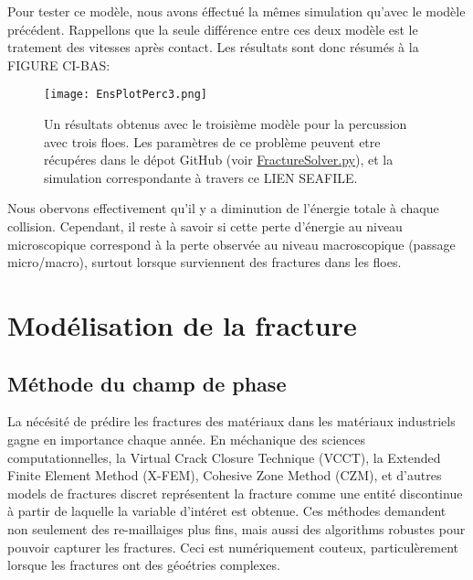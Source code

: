 Pour tester ce modèle, nous avons éffectué la mêmes simulation qu'avec le modèle précédent. Rappellons que la seule différence entre ces deux modèle est le tratement des vitesses après contact. Les résultats sont donc résumés à la FIGURE CI-BAS:
\begin{figure}[!h]
    \centering
    \texttt{[image: EnsPlotPerc3.png]}
    \caption{Un résultats obtenus avec le troisième modèle pour la percussion avec trois floes. Les paramètres de ce problème peuvent etre récupéres dans le dépot GitHub (voir \href{https://github.com/desmond-rn/ice-floes/blob/master/code/simu1D/FractureSolver.py}{FractureSolver.py}), et la simulation correspondante à travers ce LIEN SEAFILE.}
    \label{fig:frac1d5}
\end{figure}

Nous obervons effectivement qu'il y a diminution de l'énergie totale à chaque collision. Cependant, il reste à savoir si cette perte d'énergie au niveau microscopique correspond à la perte observée au niveau macroscopique (passage micro/macro), surtout lorsque surviennent des fractures dans les floes.







\section{Modélisation de la fracture}


\subsection{Méthode du champ de phase}
\label{subsubsec:approchephase}

La nécésité de prédire les fractures des matériaux dans les matériaux industriels gagne en importance chaque année. En méchanique des sciences computationnelles, la Virtual Crack Closure Technique (VCCT), la Extended Finite Element Method (X-FEM), Cohesive Zone Method (CZM), et d'autres models de fractures discret représentent la fracture comme une entité discontinue à partir de laquelle la variable d'intéret est obtenue. Ces méthodes demandent non seulement des re-maillaiges plus fins, mais aussi des algorithms robustes pour pouvoir capturer les fractures. Ceci est numériquement couteux, particulèrement lorsque les fractures ont des géoétries complexes.

